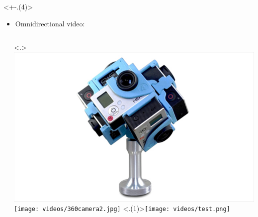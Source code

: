 \begin{frame}[c]
\begin{columns}[T]
\begin{column}{0.35\linewidth}
         \vspace{-0.25cm}
         {}%
     \end{column}
   \end{columns}

   \vfill
   \begin{minipage}[t][7cm][t]{\textwidth}
      \only<+-.(4)>{
         \begin{itemize}[<.->]
            \item Omnidirectional video:
         \end{itemize}
         \begin{columns}[T]
            \begin{column}{0.5\linewidth}
               \begin{independentCounter}
                  
               \end{independentCounter}
            \end{column}
            \begin{column}{0.5\linewidth}
               \only<.>{
                  \includegraphics[scale=0.15]{videos/360camera1.png}
                  \texttt{[image: videos/360camera2.jpg]}
                  \setcounter{tmpCounter}{\value{beamerpauses}}
               }
               \only<.(1)>{\hspace{2cm}\texttt{[image: videos/test.png]}}

\end{column}
\end{columns}}
\end{minipage}
\end{frame}
